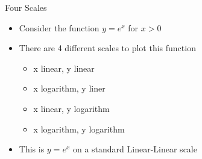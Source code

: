 \documentclass[10pt]{beamer}
\begin{document}
\begin{frame}{Four Scales}
\begin{itemize}
    \item Consider the function $y=e^x$ for $x>0$
\begin{center}
\end{center}
    \item There are 4 different scales to plot this function
    \begin{itemize}
        \item x linear, y linear
        \item x logarithm, y liner
        \item x linear, y logarithm
        \item x logarithm, y logarithm
    \end{itemize}
    \vfill
    \item This is $y=e^x$ on a standard Linear-Linear scale 
    \begin{center}
    \end{center}
\end{itemize}
\end{frame}
\end{document}
